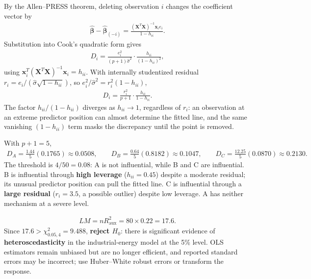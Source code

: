 \begin{solproblema}
By the Allen--PRESS theorem, deleting observation $i$ changes the coefficient vector by
\begin{align}
\hat{\boldsymbol\beta}-\hat{\boldsymbol\beta}_{(-i)}=\frac{(\mathbf X^T\mathbf X)^{-1}\mathbf x_i e_i}{1-h_{ii}}.
\end{align}
Substitution into Cook's quadratic form gives
\begin{align}
D_i=\frac{e_i^2}{(p+1)\hat\sigma^2}\cdot\frac{h_{ii}}{(1-h_{ii})^2},
\end{align}
using $\mathbf x_i^T(\mathbf X^T\mathbf X)^{-1}\mathbf x_i=h_{ii}$. With internally studentized residual $r_i=e_i/(\hat\sigma\sqrt{1-h_{ii}})$, so $e_i^2/\hat\sigma^2=r_i^2(1-h_{ii})$,
\begin{align}
D_i=\frac{r_i^2}{p+1}\cdot\frac{h_{ii}}{1-h_{ii}}.
\end{align}
The factor $h_{ii}/(1-h_{ii})$ diverges as $h_{ii}\to1$, regardless of $r_i$: an observation at an extreme predictor position can almost determine the fitted line, and the same vanishing $(1-h_{ii})$ term masks the discrepancy until the point is removed.
\end{solproblema}

\begin{solproblema}[prob:dc2ca7b]
With $p+1=5$,
\begin{align}
D_A=\frac{1.44}{5}(0.1765)\approx0.0508,\qquad D_B=\frac{0.64}{5}(0.8182)\approx0.1047,\qquad D_C=\frac{12.25}{5}(0.0870)\approx0.2130.
\end{align}
The threshold is $4/50=0.08$: A is not influential, while B and C are influential. B is influential through \textbf{high leverage} ($h_{ii}=0.45$) despite a moderate residual; its unusual predictor position can pull the fitted line. C is influential through a \textbf{large residual} ($r_i=3.5$, a possible outlier) despite low leverage. A has neither mechanism at a severe level.
\end{solproblema}

\begin{solproblema}[prob:f0b580a]
\begin{align}
LM=nR_{\text{aux}}^2=80\times0.22=17.6.
\end{align}
Since $17.6>\chi^2_{0.05,4}=9.488$, \textbf{reject $H_0$}: there is significant evidence of \textbf{heteroscedasticity} in the industrial-energy model at the 5\% level. OLS estimators remain unbiased but are no longer efficient, and reported standard errors may be incorrect; use Huber--White robust errors or transform the response.
\end{solproblema}
